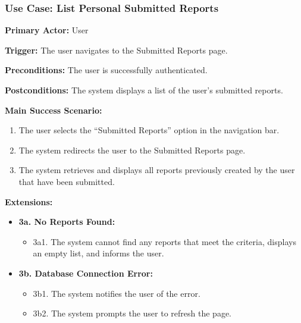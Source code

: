 \subsubsection{\textbf{Use Case: List Personal Submitted Reports}}

\textbf{Primary Actor:} User

\textbf{Trigger:} The user navigates to the Submitted Reports page.

\textbf{Preconditions:} The user is successfully authenticated.

\textbf{Postconditions:} The system displays a list of the user’s submitted reports.

\vspace{0.5cm}

\textbf{Main Success Scenario:}

\begin{enumerate} [leftmargin=0.75cm, noitemsep]
\item The user selects the ``Submitted Reports'' option in the navigation bar.
\item The system redirects the user to the Submitted Reports page.
\item The system retrieves and displays all reports previously created by the user that have been submitted.
\end{enumerate}

\vspace{0.3cm}

\textbf{Extensions:}

\begin{itemize} [label={}, leftmargin=0.75cm, noitemsep]

\item \textbf{3a. No Reports Found:}
\begin{itemize} [label={}, leftmargin=0.75cm, noitemsep]
    \item 3a1. The system cannot find any reports that meet the criteria, displays an empty list, and informs the user.
\end{itemize}

\item \textbf{3b. Database Connection Error:}
\begin{itemize} [label={}, leftmargin=0.75cm, noitemsep]
    \item 3b1. The system notifies the user of the error.
    \item 3b2. The system prompts the user to refresh the page.
\end{itemize}

\end{itemize}

\vspace{0.3cm}
